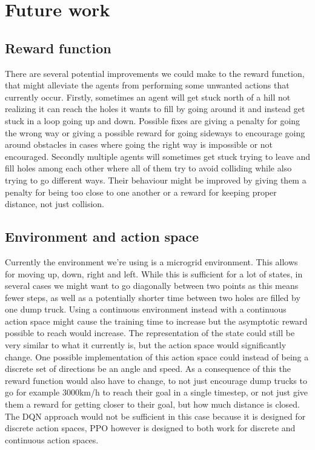 \documentclass[conference]{IEEEtran}
\begin{document}
\section{Future work}

\subsection{Reward function}
	There are several potential improvements we could make to the reward function, that might alleviate the agents from performing some unwanted actions that currently occur.
	Firstly, sometimes an agent will get stuck north of a hill not realizing it can reach the holes it wants to fill by going around it and instead get stuck in a loop going up and down.
	Possible fixes are giving a penalty for going the wrong way or giving a possible reward for going sideways to encourage going around obstacles in cases where going the right way is impossible or not encouraged.
	Secondly multiple agents will sometimes get stuck trying to leave and fill holes among each other where all of them try to avoid colliding while also trying to go different ways.
	Their behaviour might be improved by giving them a penalty for being too close to one another or a reward for keeping proper distance, not just collision.

	\subsection{Environment and action space}
	Currently the environment we're using is a microgrid environment. This allows for moving up, down, right and left.
	While this is sufficient for a lot of states, in several cases we might want to go diagonally between two points as this means fewer steps, as well as a potentially shorter time between two holes are filled by one dump truck.
	Using a continuous environment instead with a continuous action space might cause the training time to increase but the asymptotic reward possible to reach would increase. The representation of the state could still be very similar to what it currently is, but the action space would significantly change.
	One possible implementation of this action space could instead of being a discrete set of directions be an angle and speed.
	As a consequence of this the reward function would also have to change, to not just encourage dump trucks to go for example 3000km/h to reach their goal in a single timestep, or not just give them a reward for getting closer to their goal, but how much distance is closed.
	The DQN approach would not be sufficient in this case because it is designed for discrete action spaces, PPO however is designed to both work for discrete and continuous action spaces.
\end{document}
